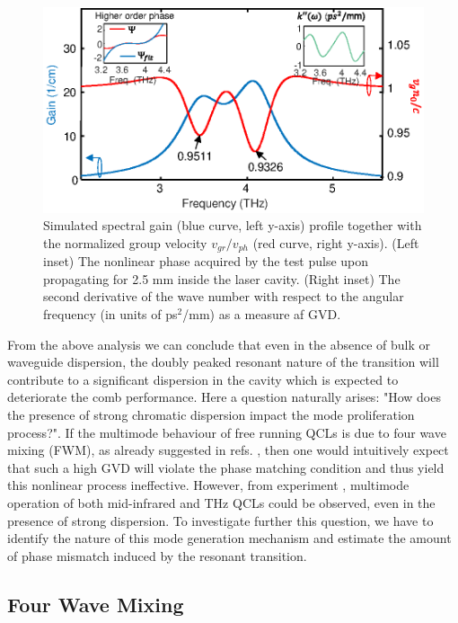 \documentclass[twocolumn,secnumarabic,amssymb, nobibnotes, aps, prd]{revtex4-1}
\begin{document}
{			\begin{figure}[h!]
				\begin{center}
					\includegraphics[scale=0.8]{figs/THZtds.eps}
					\caption{Simulated spectral gain (blue curve, left y-axis) profile together with the normalized group velocity $v_{gr}/v_{ph}$ (red curve, right y-axis). (Left inset) The nonlinear phase acquired by the test pulse upon propagating for 2.5 mm inside the laser cavity. (Right inset) The second derivative of the wave number with respect to the angular frequency (in units of ps$^2$/mm) as a measure af GVD. }  \label{fig:img03}
				\end{center}	
			\end{figure}
			
			
			From the above analysis we can conclude that even in the absence of bulk or waveguide dispersion, the doubly peaked resonant nature of the transition will contribute to a significant dispersion in the cavity which is expected to deteriorate the comb performance. Here a question naturally arises: "How does the presence of strong chromatic dispersion impact the mode proliferation process?". If the multimode behaviour of free running QCLs is due to four wave mixing (FWM), as already suggested in refs. \cite{friedli2013four,khurgin2014coherent}, then one would intuitively expect that such a high GVD will violate the phase matching condition and thus yield this nonlinear process ineffective. However, from experiment \cite{burghoff2014terahertz,rosch2015octave}, multimode operation of both mid-infrared and THz QCLs could be observed, even in the presence of strong dispersion. To investigate further this question, we have to identify the nature of this mode generation mechanism and estimate the amount of phase mismatch induced by the resonant transition. 
			
			
			\subsection{Four Wave Mixing}
			\label{subsec:FWM}
			
}
\end{document}
